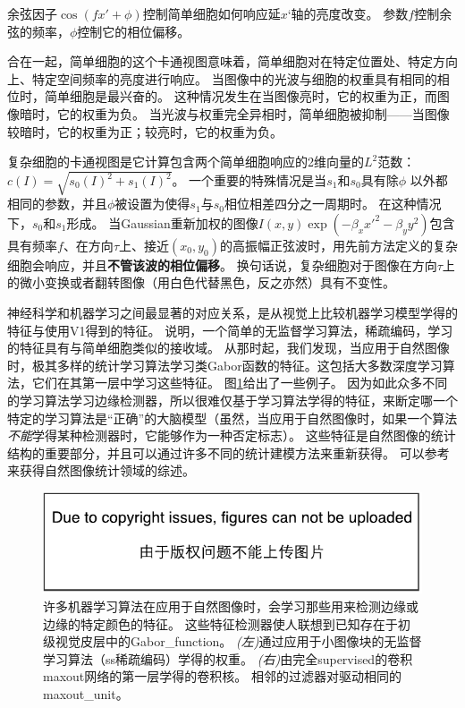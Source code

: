余弦因子$ \cos (fx' + \phi)$控制简单细胞如何响应延$x‘$轴的亮度改变。
参数$f$控制余弦的频率，$\phi$控制它的相位偏移。

合在一起，简单细胞的这个卡通视图意味着，简单细胞对在特定位置处、特定方向上、特定空间频率的亮度进行响应。
当图像中的光波与细胞的权重具有相同的相位时，简单细胞是最兴奋的。
这种情况发生在当图像亮时，它的权重为正，而图像暗时，它的权重为负。
当光波与权重完全异相时，简单细胞被抑制——当图像较暗时，它的权重为正；较亮时，它的权重为负。
 
 
复杂细胞的卡通视图是它计算包含两个简单细胞响应的2维向量的$L^2$范数：$c(I)=\sqrt{s_0(I)^2 + s_1(I)^2}$。
一个重要的特殊情况是当$s_1$和$s_0$具有除$\phi$ 以外都相同的参数，并且$\phi$被设置为使得$s_1$与$s_0$相位相差四分之一周期时。
在这种情况下，$s_0$和$s_1$形成。
当Gaussian重新加权的图像$I(x,y)\exp(-\beta_x x'^2 -\beta_y y^2)$包含具有频率$f$、在方向$\tau$上、接近$(x_0, y_0)$的高振幅正弦波时，用先前方法定义的复杂细胞会响应，并且\textbf{不管该波的相位偏移}。
换句话说，复杂细胞对于图像在方向$\tau$上的微小变换或者翻转图像（用白色代替黑色，反之亦然）具有不变性。

神经科学和机器学习之间最显著的对应关系，是从视觉上比较机器学习模型学得的特征与使用V1得到的特征。
\cite{Olshausen+Field-1996}说明，一个简单的无监督学习算法，稀疏编码，学习的特征具有与简单细胞类似的接收域。
从那时起，我们发现，当应用于自然图像时，极其多样的统计学习算法学习类Gabor函数的特征。这包括大多数深度学习算法，它们在其第一层中学习这些特征。
图\ref{fig:chap9_feature_detectors}给出了一些例子。
因为如此众多不同的学习算法学习边缘检测器，所以很难仅基于学习算法学得的特征，来断定哪一个特定的学习算法是``正确''的大脑模型（虽然，当应用于自然图像时，如果一个算法\emph{不能}学得某种检测器时，它能够作为一种否定标志）。
这些特征是自然图像的统计结构的重要部分，并且可以通过许多不同的统计建模方法来重新获得。
可以参考\citep{hyvarinen-book2009}来获得自然图像统计领域的综述。
\begin{figure}
\ifOpenSource
\centerline{\includegraphics{figure.pdf}}
\else
\centering    
{}     
\fi
\caption{许多机器学习算法在应用于自然图像时，会学习那些用来检测边缘或边缘的特定颜色的特征。
这些特征检测器使人联想到已知存在于初级视觉皮层中的\gls{Gabor_function}。
\emph{(左)}通过应用于小图像块的无监督学习算法（\gls{ss}稀疏编码）学得的权重。%
\emph{(右)}由完全\gls{supervised}的卷积\gls{maxout}网络的第一层学得的卷积核。 相邻的过滤器对驱动相同的\gls{maxout_unit}。}     
\label{fig:chap9_feature_detectors}     
\end{figure}

